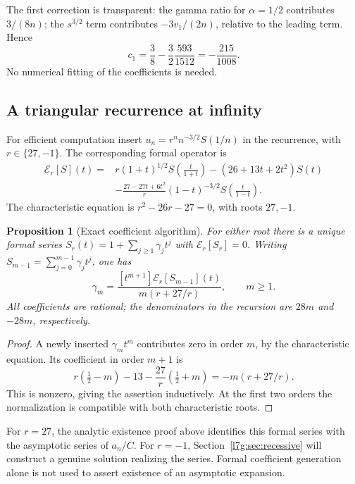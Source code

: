 \documentclass[11pt,letterpaper]{article}
\newtheorem{proposition}[theorem]{Proposition}
\theoremstyle{remark}\newtheorem{remark}[theorem]{Remark}
\newcounter{l7gtrsavedeq}
\begin{document}
The first correction is transparent: the gamma ratio for $\alpha=1/2$
contributes $3/(8n)$; the $s^{3/2}$ term contributes $-3v_1/(2n)$,
relative to the leading term. Hence
\[
 c_1=\frac38-\frac32\frac{593}{1512}=-\frac{215}{1008}.
\]
No numerical fitting of the coefficients is needed.

\subsection{A triangular recurrence at infinity}
For efficient computation insert $u_n=r^nn^{-3/2}S(1/n)$ in the
recurrence, with $r\in\{27,-1\}$. The corresponding formal operator is
\begin{equation}\label{l7g:eq:formalE}
\begin{split}
 \mathcal E_r[S](t)={}&r(1+t)^{1/2}S\!\left(\frac{t}{1+t}\right)
 -(26+13t+2t^2)S(t)\\
 &-\frac{27-27t+6t^2}{r}(1-t)^{-3/2}
                  S\!\left(\frac{t}{1-t}\right).
\end{split}
\end{equation}
The characteristic equation is $r^2-26r-27=0$, with roots $27,-1$.
\begin{proposition}[Exact coefficient algorithm]\label{l7g:prop:coeffalgo}
For either root there is a unique formal series
$S_r(t)=1+\sum_{j\ge1}\gamma_jt^j$ with $\mathcal E_r[S_r]=0$.
Writing $S_{m-1}=\sum_{j=0}^{m-1}\gamma_jt^j$, one has
\begin{equation}\label{l7g:eq:triangular}
 \gamma_m=\frac{[t^{m+1}]\mathcal E_r[S_{m-1}](t)}{m(r+27/r)},\qquad m\ge1.
\end{equation}
All coefficients are rational; the denominators in the recursion are
$28m$ and $-28m$, respectively.
\end{proposition}
\begin{proof}
A newly inserted $\gamma_mt^m$ contributes zero in order $m$, by the
characteristic equation. Its coefficient in order $m+1$ is
\[
 r(\tfrac12-m)-13-\frac{27}{r}(\tfrac12+m)=-m(r+27/r).
\]
This is nonzero, giving the assertion inductively. At the first two
orders the normalization is compatible with both characteristic roots.
\end{proof}
For $r=27$, the analytic existence proof above identifies this formal
series with the asymptotic series of $a_n/C$. For $r=-1$,
Section~\ref{l7g:sec:recessive} will construct a genuine solution
realizing the series. Formal coefficient generation alone is not used to
assert existence of an asymptotic expansion.
\end{document}
